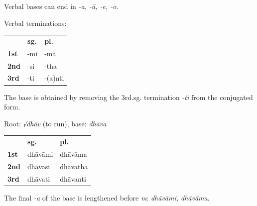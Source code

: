 \documentclass[11pt,oneside]{memoir}
\begin{document}
Verbal bases can end in \emph{-a, -ā, -e, -o}.

\bigskip
{\centering\par
\begin{multicols}{2}

Verbal terminations:

\begin{center}
\begin{tabular}{lll}
 & \textbf{sg.} & \textbf{pl.}\\[0pt]
\textbf{1st} & -mi & -ma\\[0pt]
\textbf{2nd} & -si & -tha\\[0pt]
\textbf{3rd} & -ti & -(a)nti\\[0pt]
\end{tabular}
\end{center}

The base is obtained by removing the 3rd.sg. termination \emph{-ti} from the conjugated form.

\columnbreak

Root: \emph{√dhāv} (to run), base: \emph{dhāva}

\begin{center}
\begin{tabular}{lll}
 & \textbf{sg.} & \textbf{pl.}\\[0pt]
\textbf{1st} & dhāvāmi & dhāvāma\\[0pt]
\textbf{2nd} & dhāvasi & dhāvatha\\[0pt]
\textbf{3rd} & dhāvati & dhāvanti\\[0pt]
\end{tabular}
\end{center}

The final \emph{-a} of the base is lengthened before \emph{m}: \emph{dhāvāmi, dhāvāma}.

\end{multicols}
\par}
\bigskip
\end{document}
